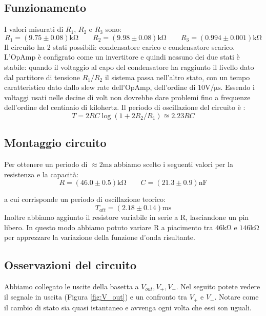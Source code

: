 \documentclass[10pt,a4paper]{article}
\begin{document}
\subsection{Funzionamento}
I valori misurati di $R_1$, $R_2$ e $R_3$ sono:
\[ R_1 = (9.75\pm 0.08)\si{\kilo\ohm} \qquad  R_2 = (9.98 \pm 0.08)\si{\kilo\ohm} \qquad   R_3 = ( 0.994 \pm0.001 ) \si{\kilo\ohm}\]
  Il circuito ha 2 stati possibili: condensatore carico e condensatore scarico. L'OpAmp è configrato come un invertitore e quindi nessuno dei due stati è stabile: quando il voltaggio al capo del condensatore ha raggiunto il livello dato dal partitore di tensione $R_1/R_2$ il sistema passa nell'altro stato, con un tempo caratteristico dato dallo slew rate dell'OpAmp, dell'ordine di $10 \si{\volt\per\micro\second}$. Essendo i voltaggi usati nelle decine di volt non dovrebbe dare problemi fino a frequenze dell'ordine del centinaio di kilohertz.\label{slew_rate_count}
Il periodo di oscillazione del circuito è : \[ T = 2 RC \log( 1+ 2 R_2/R_1) \approxeq 2.23 RC\]
\subsection{Montaggio circuito}
Per ottenere un periodo di $\approx 2 \si{\milli\second}$ abbiamo scelto i seguenti valori per la resistenza e la capacità:
\[ R = ( 46.0 \pm0.5 )\si{\kilo\ohm} \qquad   C = (21.3\pm0.9 )\si{\nano \farad}\]

a cui corrisponde un periodo di oscillazione teorico:
\[T_{att}= (2.18\pm 0.14 )\si{\milli \second}\]
Inoltre abbiamo aggiunto il resistore variabile in serie a R, lasciandone un pin libero. In questo modo abbiamo potuto variare R a piacimento tra $46 \si{\kilo\ohm}$ e $146 \si{\kilo\ohm}$ per apprezzare la variazione della funzione d'onda risultante.


\subsection{Osservazioni del circuito}
Abbiamo collegato le uscite della basetta a $V_{out}, V_{+}, V_{-}$. Nel seguito potete vedere il segnale in uscita (Figura \ref{fig:V_out}) e un confronto tra $V_{+}$ e $V_{-}$. Notare come il cambio di stato sia quasi istantaneo e avvenga ogni volta che essi son uguali.
 
\end{document}
